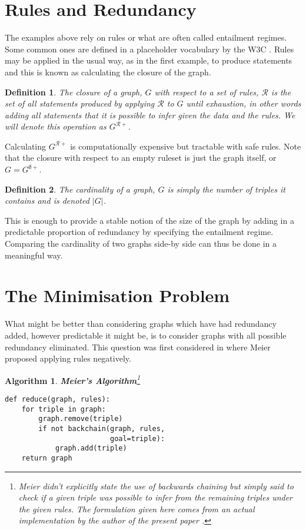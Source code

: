 \documentclass{article}
\newtheorem{defn}{Definition}
\newtheorem{alg}{Algorithm}
\begin{document}
\section{Rules and Redundancy}

The examples above rely on rules or what are often called
entailment regimes. Some common ones are defined in a 
placeholder vocabulary by the W3C \cite{SWER10}. Rules may
be applied in the usual way, as in the first example, to
produce statements and this is known as calculating the
closure of the graph.

\begin{defn}
  The {\em closure} of a graph, $G$ with respect to a set of
  rules, ${\mathcal R}$ is the set of all statements produced by
  applying ${\mathcal R}$ to $G$ until exhaustion, in other words
  adding all statements that it is possible to infer given the
  data and the rules. We will denote this operation as 
  $G^{{\mathcal R}+}$.
\end{defn}

Calculating $G^{{\mathcal R}+}$ is computationally expensive
but tractable with safe rules. Note that the closure with
respect to an empty ruleset is just the graph itself, or
$G = G^{\emptyset+}$.

\begin{defn}
  The {\em cardinality} of a graph, $G$ is simply the number of
  triples it contains and is denoted $|G|$.
\end{defn}

This is enough to provide a stable notion of the size of 
the graph by adding in a predictable proportion of redundancy
by specifying the entailment regime. Comparing the cardinality
of two graphs side-by side can thus be done in a meaningful
way.

\section{The Minimisation Problem}

What might be better than considering graphs which have had
redundancy added, however predictable it might be, is to
consider graphs with all possible redundancy eliminated. This
question was first considered in \cite{MEIER08} where Meier
proposed applying rules negatively.

\begin{alg}{{\bf Meier's Algorithm}\footnote{
  Meier didn't explicitly state the use of backwards 
  chaining but simply said to check if a given triple
  was possible to infer from the remaining triples
  under the given rules. The formulation given here
  comes from an actual implementation by the author
  of the present paper \cite{GM10}.
}}
  \smallskip
\begin{verbatim}
def reduce(graph, rules):
    for triple in graph:
        graph.remove(triple)
        if not backchain(graph, rules,
                         goal=triple):
            graph.add(triple)
    return graph
\end{verbatim}
  \smallskip
\end{alg}
\end{document}
